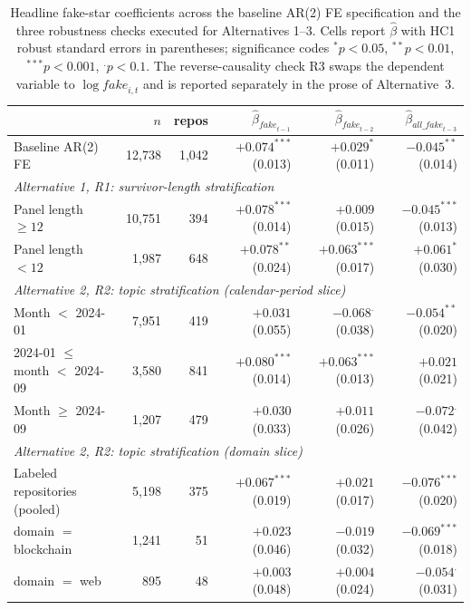 \begin{table}[t]
    \footnotesize
    \centering
    \caption{Headline fake-star coefficients across the baseline AR(2) FE specification and the three robustness checks executed for Alternatives 1--3.
    Cells report $\hat\beta$ with HC1 robust standard errors in parentheses; significance codes $^{*}p<0.05$, $^{**}p<0.01$, $^{***}p<0.001$, $^{.}p<0.1$.
    The reverse-causality check R3 swaps the dependent variable to $\log \textit{fake}_{i,t}$ and is reported separately in the prose of Alternative~3.}
    \label{tab:fake-stars-robustness}
    \begin{tabular}{lrrrrr}
    \toprule
     & $n$ & repos & $\hat\beta_{\textit{fake}_{t-1}}$ & $\hat\beta_{\textit{fake}_{t-2}}$ & $\hat\beta_{\textit{all\_fake}_{t-3}}$ \\
    \midrule
    Baseline AR(2) FE & 12{,}738 & 1{,}042 & $+0.074^{***}$ (0.013) & $+0.029^{*}$ (0.011) & $-0.045^{**}$ (0.014) \\
    \midrule
    \multicolumn{6}{l}{\emph{Alternative 1, R1: survivor-length stratification}} \\
    Panel length $\geq 12$ & 10{,}751 & 394 & $+0.078^{***}$ (0.014) & $+0.009$ (0.015) & $-0.045^{***}$ (0.013) \\
    Panel length $< 12$ & 1{,}987 & 648 & $+0.078^{**}$ (0.024) & $+0.063^{***}$ (0.017) & $+0.061^{*}$ (0.030) \\
    \midrule
    \multicolumn{6}{l}{\emph{Alternative 2, R2: topic stratification (calendar-period slice)}} \\
    Month $<$ 2024-01 & 7{,}951 & 419 & $+0.031$ (0.055) & $-0.068^{.}$ (0.038) & $-0.054^{**}$ (0.020) \\
    2024-01 $\leq$ month $<$ 2024-09 & 3{,}580 & 841 & $+0.080^{***}$ (0.014) & $+0.063^{***}$ (0.013) & $+0.021$ (0.021) \\
    Month $\geq$ 2024-09 & 1{,}207 & 479 & $+0.030$ (0.033) & $+0.011$ (0.026) & $-0.072^{.}$ (0.042) \\
    \midrule
    \multicolumn{6}{l}{\emph{Alternative 2, R2: topic stratification (domain slice)}} \\
    Labeled repositories (pooled) & 5{,}198 & 375 & $+0.067^{***}$ (0.019) & $+0.021$ (0.017) & $-0.076^{***}$ (0.020) \\
    \quad domain $=$ blockchain & 1{,}241 & 51 & $+0.023$ (0.046) & $-0.019$ (0.032) & $-0.069^{***}$ (0.018) \\
    \quad domain $=$ web & 895 & 48 & $+0.003$ (0.048) & $+0.004$ (0.024) & $-0.054^{.}$ (0.031) \\

\end{tabular}
\end{table}
